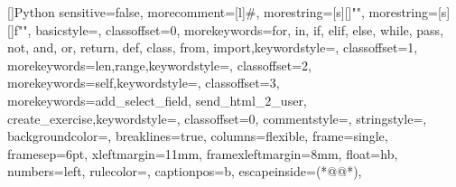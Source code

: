 


  	[]{Python}
  	{
  	sensitive=false,
  	morecomment=[l]{\#},
	morestring=[s][\color{py_str_col}]{"}{"},
	morestring=[s][\color{py_str_col}]{f"}{"},
	basicstyle=\rmfamily\selectfont\color{white},
	classoffset=0,
	morekeywords={for, in, if, elif, else, while, pass, not, and, or, return, def, class, from, import},keywordstyle={\color{py_key_col}\bfseries},
  	classoffset=1,
  	morekeywords={len,range},keywordstyle=\color{py_buin_col},
  	classoffset=2,
  	morekeywords={self},keywordstyle=\color{py_self_col},
  	classoffset=3,
  	morekeywords={add_select_field, send_html_2_user, create_exercise},keywordstyle=\color{py_def_col},
  	classoffset=0,
  	commentstyle={\color{py_com_col}},
  	stringstyle=\color{py_str_col},
  	backgroundcolor={\color{py_bak_col}},
  	breaklines=true,
  	columns=flexible,
  	frame=single,
  	framesep=6pt,
  	xleftmargin=11mm,
  	framexleftmargin=8mm,
  	float=hb,   %
  	numbers=left,
  	rulecolor=\color{white},
  	captionpos=b, %
  	escapeinside={(*@}{@*)},
  	}


